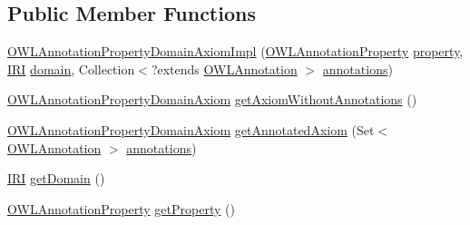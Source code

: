 \subsection*{Public Member Functions}
\begin{DoxyCompactItemize}
\item 
\hyperlink{classuk_1_1ac_1_1manchester_1_1cs_1_1owl_1_1owlapi_1_1_o_w_l_annotation_property_domain_axiom_impl_aad2d20e8fac76d8a80a42fc79abfcf98}{O\-W\-L\-Annotation\-Property\-Domain\-Axiom\-Impl} (\hyperlink{interfaceorg_1_1semanticweb_1_1owlapi_1_1model_1_1_o_w_l_annotation_property}{O\-W\-L\-Annotation\-Property} \hyperlink{classuk_1_1ac_1_1manchester_1_1cs_1_1owl_1_1owlapi_1_1_o_w_l_annotation_property_domain_axiom_impl_a09f1227e113575b3d4caf8e2e700401a}{property}, \hyperlink{classorg_1_1semanticweb_1_1owlapi_1_1model_1_1_i_r_i}{I\-R\-I} \hyperlink{classuk_1_1ac_1_1manchester_1_1cs_1_1owl_1_1owlapi_1_1_o_w_l_annotation_property_domain_axiom_impl_a8e9b6660c1ae48f283b2f0baf7ad04ac}{domain}, Collection$<$?extends \hyperlink{interfaceorg_1_1semanticweb_1_1owlapi_1_1model_1_1_o_w_l_annotation}{O\-W\-L\-Annotation} $>$ \hyperlink{classuk_1_1ac_1_1manchester_1_1cs_1_1owl_1_1owlapi_1_1_o_w_l_axiom_impl_af6fbf6188f7bdcdc6bef5766feed695e}{annotations})
\item 
\hyperlink{interfaceorg_1_1semanticweb_1_1owlapi_1_1model_1_1_o_w_l_annotation_property_domain_axiom}{O\-W\-L\-Annotation\-Property\-Domain\-Axiom} \hyperlink{classuk_1_1ac_1_1manchester_1_1cs_1_1owl_1_1owlapi_1_1_o_w_l_annotation_property_domain_axiom_impl_abfcdf736ad28036cd1e85a944b1b959c}{get\-Axiom\-Without\-Annotations} ()
\item 
\hyperlink{interfaceorg_1_1semanticweb_1_1owlapi_1_1model_1_1_o_w_l_annotation_property_domain_axiom}{O\-W\-L\-Annotation\-Property\-Domain\-Axiom} \hyperlink{classuk_1_1ac_1_1manchester_1_1cs_1_1owl_1_1owlapi_1_1_o_w_l_annotation_property_domain_axiom_impl_a456e1d50dadf8dc94dc8bfe25c21f3ff}{get\-Annotated\-Axiom} (Set$<$ \hyperlink{interfaceorg_1_1semanticweb_1_1owlapi_1_1model_1_1_o_w_l_annotation}{O\-W\-L\-Annotation} $>$ \hyperlink{classuk_1_1ac_1_1manchester_1_1cs_1_1owl_1_1owlapi_1_1_o_w_l_axiom_impl_af6fbf6188f7bdcdc6bef5766feed695e}{annotations})
\item 
\hyperlink{classorg_1_1semanticweb_1_1owlapi_1_1model_1_1_i_r_i}{I\-R\-I} \hyperlink{classuk_1_1ac_1_1manchester_1_1cs_1_1owl_1_1owlapi_1_1_o_w_l_annotation_property_domain_axiom_impl_a58bdde1fbc57c9e9351ffb26d104a91d}{get\-Domain} ()
\item 
\hyperlink{interfaceorg_1_1semanticweb_1_1owlapi_1_1model_1_1_o_w_l_annotation_property}{O\-W\-L\-Annotation\-Property} \hyperlink{classuk_1_1ac_1_1manchester_1_1cs_1_1owl_1_1owlapi_1_1_o_w_l_annotation_property_domain_axiom_impl_afe50bfc4b00d187fd10a286f2ac23603}{get\-Property} ()

\end{DoxyCompactItemize}
